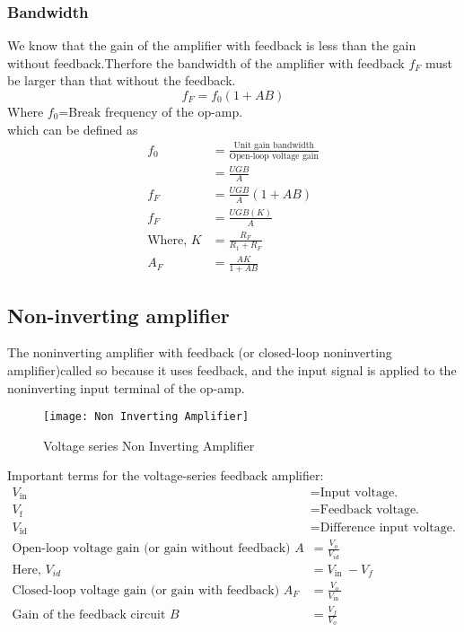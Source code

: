    \subsubsection{Bandwidth}
   We know that the gain of the amplifier with feedback is less than the gain without feedback.Therfore the bandwidth of the amplifier with feedback $f_F$ must be larger than that without the feedback.
   $$f_F=f_0(1+AB)$$
   Where $f_0$=Break frequency of the op-amp.\\
   which can be defined as 
   \begin{align*}
   f_0&=\frac{\text{Unit gain bandwidth}}{\text{Open-loop voltage gain}}\\
   &=\frac{UGB}{A}\\
   f_F&=\frac{UGB}{A}(1+AB)\\
   f_F&=\frac{UGB(K)}{A}\\
   \text{Where, } K&=\frac{R_F}{R_1+R_F}\\
   A_F&=\frac{AK}{1+AB}
   \end{align*}
   
   \subsection{Non-inverting amplifier}
   The noninverting amplifier with feedback (or closed-loop noninverting amplifier)called so  because it uses feedback, and the input signal is applied to the noninverting input terminal of the op-amp.
   \begin{figure}[H]
   	\centering
   	\texttt{[image: Non Inverting Amplifier]}
   	\caption{Voltage series Non Inverting Amplifier}
   	\label{Non Inverting Amplifier}
   \end{figure}
   Important terms for the voltage-series feedback amplifier:
   \begin{align*}
   V_{\text {in }}&= \text{Input voltage.}\\
   V_{\text {f }}&=\text{Feedback voltage.}\\
   V_{\text {id }}&=\text{Difference input voltage.}\\
   \text{Open-loop voltage gain (or gain without feedback) } A&=\frac{V_{o}}{V_{i d}}\\
   \text{Here, } V_{i d}&=V_{\text {in }}-V_{f}\\
   \text{Closed-loop voltage gain (or gain with feedback) } A_{F}&=\frac{V_{o}}{V_{\text {in }}}\\
   \text{Gain of the feedback circuit } B&=\frac{V_{f}}{V_{o}}
   \end{align*}
   
